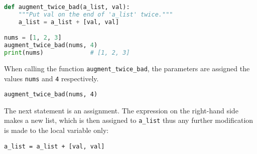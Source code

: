 \begin{lstlisting}[language=Python]
def augment_twice_bad(a_list, val):
    """Put val on the end of 'a_list' twice."""
    a_list = a_list + [val, val]

nums = [1, 2, 3]
augment_twice_bad(nums, 4)
print(nums)             # [1, 2, 3]
\end{lstlisting}

When calling the function \texttt{augment\_twice\_bad}, the parameters are assigned the values \texttt{nums} and \texttt{4} respectively. 

\begin{center}
\texttt{augment\_twice\_bad(nums, 4)}
\end{center}

\begin{center}
\end{center}


The next statement is an assignment. The expression on the right-hand side makes a new list, which is then assigned to \texttt{a\_list} thus any further modification is made to the local variable only:

\begin{center}
\texttt{a\_list = a\_list + [val, val]}
\end{center}

